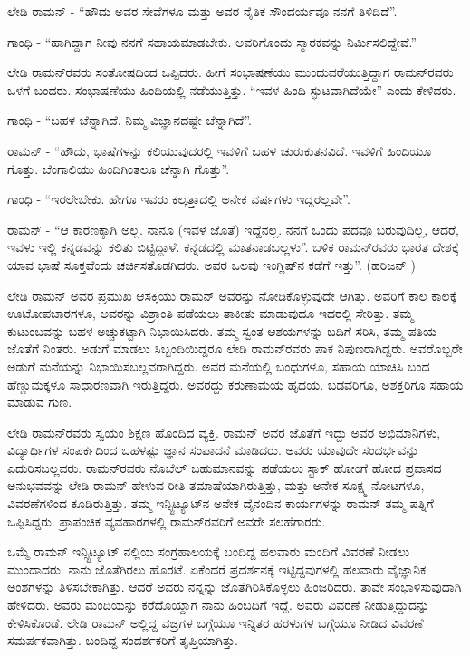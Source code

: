 ಲೇಡಿ ರಾಮನ್ - “ಹೌದು ಅವರ ಸೇವೆಗಳೂ ಮತ್ತು ಅವರ ನೈತಿಕ ಸೌಂದರ್ಯವೂ ನನಗೆ ತಿಳಿದಿದೆ”.

ಗಾಂಧಿ - “ಹಾಗಿದ್ದಾಗ ನೀವು ನನಗೆ ಸಹಾಯಮಾಡಬೇಕು. ಅವರಿಗೊಂದು ಸ್ಮಾರಕವನ್ನು ನಿರ್ಮಿಸಲಿದ್ದೇವೆ.”

ಲೇಡಿ ರಾಮನ್‍ರವರು ಸಂತೋಷದಿಂದ ಒಪ್ಪಿದರು. ಹೀಗೆ ಸಂಭಾಷಣೆಯು ಮುಂದುವರೆಯುತ್ತಿದ್ದಾಗ ರಾಮನ್‍ರವರು ಒಳಗೆ ಬಂದರು. ಸಂಭಾಷಣೆಯು ಹಿಂದಿಯಲ್ಲಿ ನಡೆಯುತ್ತಿತ್ತು. “ಇವಳ ಹಿಂದಿ ಸ್ಫುಟವಾಗಿದೆಯೇ” ಎಂದು ಕೇಳಿದರು.

ಗಾಂಧಿ - “ಬಹಳ ಚೆನ್ನಾಗಿದೆ. ನಿಮ್ಮ ವಿಜ್ಞಾನದಷ್ಟೇ ಚೆನ್ನಾಗಿದೆ”.

ರಾಮನ್ - “ಹೌದು, ಭಾಷೆಗಳನ್ನು ಕಲಿಯುವುದರಲ್ಲಿ ಇವಳಿಗೆ ಬಹಳ ಚುರುಕುತನವಿದೆ. ಇವಳಿಗೆ ಹಿಂದಿಯೂ ಗೊತ್ತು. ಬೆಂಗಾಲಿಯು ಹಿಂದಿಗಿಂತಲೂ ಚೆನ್ನಾಗಿ ಗೊತ್ತು”.

ಗಾಂಧಿ - “ಇರಲೇಬೇಕು. ಹೇಗೂ ಇವರು ಕಲ್ಕತ್ತಾದಲ್ಲಿ ಅನೇಕ ವರ್ಷಗಳು ಇದ್ದರಲ್ಲವೇ”.

ರಾಮನ್ - “ಆ ಕಾರಣಕ್ಕಾಗಿ ಅಲ್ಲ. ನಾನೂ (ಇವಳ ಜೊತೆ) ಇದ್ದೆನಲ್ಲ. ನನಗೆ ಒಂದು ಪದವೂ ಬರುವುದಿಲ್ಲ, ಆದರೆ, ಇವಳು ಇಲ್ಲಿ ಕನ್ನಡವನ್ನು ಕಲಿತು ಬಿಟ್ಟಿದ್ದಾಳೆ. ಕನ್ನಡದಲ್ಲಿ ಮಾತನಾಡಬಲ್ಲಳು”. ಬಳಿಕ ರಾಮನ್‍ರವರು ಭಾರತ ದೇಶಕ್ಕೆ ಯಾವ ಭಾಷೆ ಸೂಕ್ತವೆಂದು ಚರ್ಚಿಸತೊಡಗಿದರು. ಅವರ ಒಲವು ಇಂಗ್ಲಿಷ್‍ನ ಕಡೆಗೆ ಇತ್ತು”. (ಹರಿಜನ್ )

ಲೇಡಿ ರಾಮನ್ ಅವರ ಪ್ರಮುಖ ಆಸಕ್ತಿಯು ರಾಮನ್ ಅವರನ್ನು ನೋಡಿಕೊಳ್ಳುವುದೇ ಆಗಿತ್ತು. ಅವರಿಗೆ ಕಾಲ ಕಾಲಕ್ಕೆ ಊಟೋಪಚಾರಗಳೂ, ಅವರನ್ನು ವಿಶ್ರಾಂತಿ ಪಡೆಯಲು ತಾಕೀತು ಮಾಡುವುದೂ ಇದರಲ್ಲಿ ಸೇರಿತ್ತು. ತಮ್ಮ ಕುಟುಂಬವನ್ನು ಬಹಳ ಅಚ್ಚುಕಟ್ಟಾಗಿ ನಿಭಾಯಿಸಿದರು. ತಮ್ಮ ಸ್ವಂತ ಆಶಯಗಳನ್ನು ಬದಿಗೆ ಸರಿಸಿ, ತಮ್ಮ ಪತಿಯ ಜೊತೆಗೆ ನಿಂತರು. ಅಡುಗೆ ಮಾಡಲು ಸಿಬ್ಬಂದಿಯಿದ್ದರೂ ಲೇಡಿ ರಾಮನ್‍ರವರು ಪಾಕ ನಿಪುಣರಾಗಿದ್ದರು. ಅವರೊಬ್ಬರೇ ಅಡುಗೆ ಮನೆಯನ್ನು ನಿಭಾಯಿಸಬಲ್ಲವರಾಗಿದ್ದರು. ಅವರ ಮನೆಯಲ್ಲಿ ಬಂಧುಗಳೂ, ಸಹಾಯ ಯಾಚಿಸಿ ಬಂದ ಹೆಣ್ಣುಮಕ್ಕಳೂ ಸಾಧಾರಣವಾಗಿ ಇರುತ್ತಿದ್ದರು. ಅವರದ್ದು ಕರುಣಾಮಯ ಹೃದಯ. ಬಡವರಿಗೂ, ಅಶಕ್ತರಿಗೂ ಸಹಾಯ ಮಾಡುವ ಗುಣ.

ಲೇಡಿ ರಾಮನ್‍ರವರು ಸ್ವಯಂ ಶಿಕ್ಷಣ ಹೊಂದಿದ ವ್ಯಕ್ತಿ. ರಾಮನ್ ಅವರ ಜೊತೆಗೆ ಇದ್ದು ಅವರ ಅಭಿಮಾನಿಗಳು, ವಿದ್ಯಾರ್ಥಿಗಳ ಸಂಪರ್ಕದಿಂದ ಬಹಳಷ್ಟು ಜ್ಞಾನ ಸಂಪಾದನೆ ಮಾಡಿದರು. ಅವರು ಯಾವುದೇ ಸಂದರ್ಭವನ್ನು ಎದುರಿಸಬಲ್ಲವರು. ರಾಮನ್‍ರವರು ನೊಬೆಲ್ ಬಹುಮಾನವನ್ನು ಪಡೆಯಲು ಸ್ಟಾಕ್ ಹೋಂಗೆ ಹೋದ ಪ್ರವಾಸದ ಅನುಭವವನ್ನು ಲೇಡಿ ರಾಮನ್ ಹೇಳುವ ರೀತಿ ತಮಾಷೆಯಾಗಿರುತ್ತಿತ್ತು, ಮತ್ತು ಅನೇಕ ಸೂಕ್ಷ್ಮ ನೋಟಗಳೂ, ವಿವರಣೆಗಳಿಂದ ಕೂಡಿರುತ್ತಿತ್ತು. ತಮ್ಮ ಇನ್ಸ್ಟಿಟ್ಯೂಟ್‍ನ ಅನೇಕ ದೈನಂದಿನ ಕಾರ್ಯಗಳನ್ನು ರಾಮನ್ ತಮ್ಮ ಪತ್ನಿಗೆ ಒಪ್ಪಿಸಿದ್ದರು. ಪ್ರಾಪಂಚಿಕ ವ್ಯವಹಾರಗಳಲ್ಲಿ ರಾಮನ್‍ರವರಿಗೆ ಅವರೇ ಸಲಹೆಗಾರರು.

ಒಮ್ಮೆ ರಾಮನ್ ಇನ್ಸ್ಟಿಟ್ಯೂಟ್ ನಲ್ಲಿಯ ಸಂಗ್ರಹಾಲಯಕ್ಕೆ ಬಂದಿದ್ದ ಹಲವಾರು ಮಂದಿಗೆ ವಿವರಣೆ ನೀಡಲು ಮುಂದಾದರು. ನಾನು ಜೊತೆಗಿರಲು ಹೊರಟೆ. ಏಕೆಂದರೆ ಪ್ರದರ್ಶನಕ್ಕೆ ಇಟ್ಟಿದ್ದವುಗಳಲ್ಲಿ ಹಲವಾರು ವೈಜ್ಞಾನಿಕ ಅಂಶಗಳನ್ನು ತಿಳಿಸಬೇಕಾಗಿತ್ತು. ಆದರೆ ಅವರು ನನ್ನನ್ನು ಜೊತೆಗಿರಿಸಿಕೊಳ್ಳಲು ಹಿಂಜರಿದರು. ತಾವೇ ಸಂಭಾಳಿಸುವುದಾಗಿ ಹೇಳಿದರು. ಅವರು ಮಂದಿಯನ್ನು ಕರೆದೊಯ್ದಾಗ ನಾನು ಹಿಂಬದಿಗೆ ಇದ್ದೆ. ಅವರು ವಿವರಣೆ ನೀಡುತ್ತಿದ್ದುದನ್ನು ಕೇಳಿಸಿಕೊಂಡೆ. ಲೇಡಿ ರಾಮನ್ ಅಲ್ಲಿದ್ದ ವಜ್ರಗಳ ಬಗ್ಗೆಯೂ ಇನ್ನಿತರ ಹರಳುಗಳ ಬಗ್ಗೆಯೂ ನೀಡಿದ ವಿವರಣೆ ಸಮರ್ಪಕವಾಗಿತ್ತು. ಬಂದಿದ್ದ ಸಂದರ್ಶಕರಿಗೆ ತೃಪ್ತಿಯಾಗಿತ್ತು.

